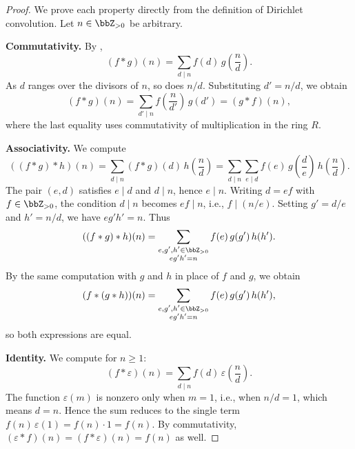 \begin{proof}
    We prove each property directly from the definition of Dirichlet convolution. Let $n \in \bbZ_{>0}$ be arbitrary.

    \textbf{Commutativity.} By ,
    $$(f * g)(n) = \sum_{d \mid n} f(d)\, g\left(\frac{n}{d}\right).$$
    As $d$ ranges over the divisors of $n$, so does $n/d$. Substituting $d' = n/d$, we obtain
    $$(f * g)(n) = \sum_{d' \mid n} f\left(\frac{n}{d'}\right)\, g(d') = (g * f)(n),$$
    where the last equality uses commutativity of multiplication in the ring $R$.

    \textbf{Associativity.} We compute
    $$((f * g) * h)(n) = \sum_{d \mid n} (f * g)(d)\, h\left(\frac{n}{d}\right) = \sum_{d \mid n} \sum_{e \mid d} f(e)\, g\left(\frac{d}{e}\right)\, h\left(\frac{n}{d}\right).$$
    The pair $(e,d)$ satisfies $e \mid d$ and $d \mid n$, hence $e \mid n$. Writing $d = ef$ with $f \in \bbZ_{>0}$, the condition $d \mid n$ becomes $ef \mid n$, i.e., $f \mid (n/e)$. Setting $g' = d/e$ and $h' = n/d$, we have $e g' h' = n$. Thus
    $$((f * g) * h)(n) = \sum_{\substack{e, g', h' \in \bbZ_{>0} \\ e g' h' = n}} f(e)\, g(g')\, h(h').$$
    By the same computation with $g$ and $h$ in place of $f$ and $g$, we obtain
    $$(f * (g * h))(n) = \sum_{\substack{e, g', h' \in \bbZ_{>0} \\ e g' h' = n}} f(e)\, g(g')\, h(h'),$$
    so both expressions are equal.

    \textbf{Identity.} We compute for $n \geq 1$:
    $$(f * \varepsilon)(n) = \sum_{d \mid n} f(d)\, \varepsilon\left(\frac{n}{d}\right).$$
    The function $\varepsilon(m)$ is nonzero only when $m = 1$, i.e., when $n/d = 1$, which means $d = n$. Hence the sum reduces to the single term $f(n)\, \varepsilon(1) = f(n) \cdot 1 = f(n)$. By commutativity, $(\varepsilon * f)(n) = (f * \varepsilon)(n) = f(n)$ as well.
\end{proof}